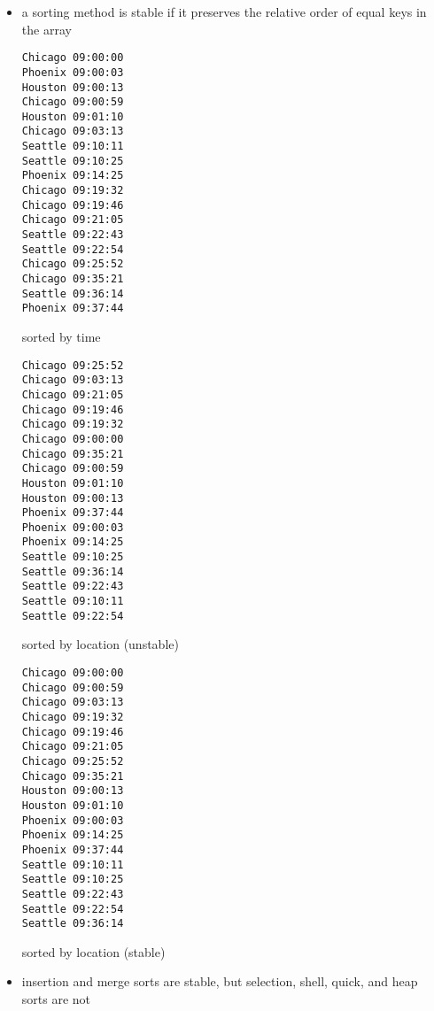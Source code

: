 \documentclass[8pt,a4paper,compress]{beamer}
\begin{document}
\begin{frame}[fragile]
\begin{itemize}
\item a sorting method is stable if it preserves the relative order of equal keys in the array

\begin{minipage}{65pt}
\begin{lstlisting}[language={},backgroundcolor=\color{white}]
Chicago 09:00:00
Phoenix 09:00:03
Houston 09:00:13
Chicago 09:00:59
Houston 09:01:10
Chicago 09:03:13
Seattle 09:10:11
Seattle 09:10:25
Phoenix 09:14:25
Chicago 09:19:32
Chicago 09:19:46
Chicago 09:21:05
Seattle 09:22:43
Seattle 09:22:54
Chicago 09:25:52
Chicago 09:35:21
Seattle 09:36:14
Phoenix 09:37:44
\end{lstlisting}
\begin{center}
\tiny sorted by time
\end{center}
\end{minipage}\hfill
\begin{minipage}{65pt}
\begin{lstlisting}[language={},backgroundcolor=\color{white}]
Chicago 09:25:52
Chicago 09:03:13
Chicago 09:21:05
Chicago 09:19:46
Chicago 09:19:32
Chicago 09:00:00
Chicago 09:35:21
Chicago 09:00:59
Houston 09:01:10
Houston 09:00:13
Phoenix 09:37:44
Phoenix 09:00:03
Phoenix 09:14:25
Seattle 09:10:25
Seattle 09:36:14
Seattle 09:22:43
Seattle 09:10:11
Seattle 09:22:54
\end{lstlisting}
\begin{center}
\tiny sorted by location (unstable)
\end{center}
\end{minipage}\hfill
\begin{minipage}{65pt}
\begin{lstlisting}[language={},backgroundcolor=\color{white}]
Chicago 09:00:00
Chicago 09:00:59
Chicago 09:03:13
Chicago 09:19:32
Chicago 09:19:46
Chicago 09:21:05
Chicago 09:25:52
Chicago 09:35:21
Houston 09:00:13
Houston 09:01:10
Phoenix 09:00:03
Phoenix 09:14:25
Phoenix 09:37:44
Seattle 09:10:11
Seattle 09:10:25
Seattle 09:22:43
Seattle 09:22:54
Seattle 09:36:14
\end{lstlisting}
\begin{center}
\tiny sorted by location (stable)
\end{center}
\end{minipage}

\item insertion and merge sorts are stable, but selection, shell, quick, and heap sorts are not
\end{itemize}
\end{frame}
\end{document}
